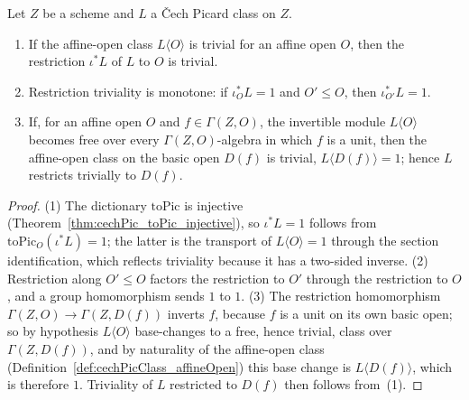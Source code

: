 \begin{theorem}
  \label{thm:cechPicClass_triv}
  \leanok
  Let \(Z\) be a scheme and \(L\) a \v Cech Picard class on \(Z\).
  \begin{enumerate}
    \item If the affine-open class \(L\langle O\rangle\) is trivial for an affine open \(O\), then
      the restriction \(\iota^{*}L\) of \(L\) to \(O\) is trivial.
    \item Restriction triviality is monotone: if \(\iota_O^{*}L = 1\) and \(O' \le O\), then
      \(\iota_{O'}^{*}L = 1\).
    \item If, for an affine open \(O\) and \(f \in \Gamma(Z, O)\), the invertible module \(L\langle
      O\rangle\) becomes free over every \(\Gamma(Z, O)\)-algebra in which \(f\) is a unit, then the
      affine-open class on the basic open \(D(f)\) is trivial, \(L\langle D(f)\rangle = 1\); hence
      \(L\) restricts trivially to \(D(f)\).
  \end{enumerate}
\end{theorem}
\begin{proof}
  \leanok
  (1) The dictionary \(\mathrm{toPic}\) is injective (Theorem~\ref{thm:cechPic_toPic_injective}), so
  \(\iota^{*}L = 1\) follows from \(\mathrm{toPic}_O(\iota^{*}L) = 1\); the latter is the transport
  of \(L\langle O\rangle = 1\) through the section identification, which reflects triviality because
  it has a two-sided inverse. (2) Restriction along \(O' \le O\) factors the restriction to \(O'\)
  through the restriction to \(O\), and a group homomorphism sends \(1\) to \(1\). (3) The
  restriction homomorphism \(\Gamma(Z, O) \to \Gamma(Z, D(f))\) inverts \(f\), because \(f\) is a
  unit on its own basic open; so by hypothesis \(L\langle O\rangle\) base-changes to a free, hence
  trivial, class over \(\Gamma(Z, D(f))\), and by naturality of the affine-open class
  (Definition~\ref{def:cechPicClass_affineOpen}) this base change is \(L\langle D(f)\rangle\), which
  is therefore \(1\). Triviality of \(L\) restricted to \(D(f)\) then follows from~(1).
\end{proof}

